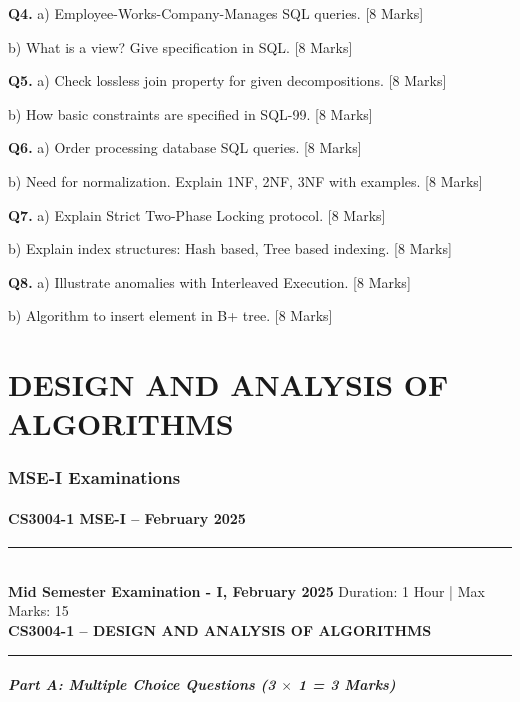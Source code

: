 \documentclass[11pt,a4paper]{article}
\newcommand{\examheader}[4]{
\noindent\rule{\textwidth}{0.5pt}\\
\textbf{#1} \hfill Duration: #3 | Max Marks: #4\\
\textbf{#2}\\
\rule{\textwidth}{0.5pt}
\vspace{0.2cm}
}
\begin{document}
\textbf{Q4.} a) Employee-Works-Company-Manages SQL queries. \hfill [8 Marks]

b) What is a view? Give specification in SQL. \hfill [8 Marks]

\textbf{Q5.} a) Check lossless join property for given decompositions. \hfill [8 Marks]

b) How basic constraints are specified in SQL-99. \hfill [8 Marks]

\textbf{Q6.} a) Order processing database SQL queries. \hfill [8 Marks]

b) Need for normalization. Explain 1NF, 2NF, 3NF with examples. \hfill [8 Marks]

\textbf{Q7.} a) Explain Strict Two-Phase Locking protocol. \hfill [8 Marks]

b) Explain index structures: Hash based, Tree based indexing. \hfill [8 Marks]

\textbf{Q8.} a) Illustrate anomalies with Interleaved Execution. \hfill [8 Marks]

b) Algorithm to insert element in B+ tree. \hfill [8 Marks]

\newpage
\part{DESIGN AND ANALYSIS OF ALGORITHMS}

\section{MSE-I Examinations}

\subsection{CS3004-1 MSE-I -- February 2025}
\examheader{Mid Semester Examination - I, February 2025}{CS3004-1 -- DESIGN AND ANALYSIS OF ALGORITHMS}{1 Hour}{15}

\subsubsection*{Part A: Multiple Choice Questions (3 $\times$ 1 = 3 Marks)}
\end{document}
